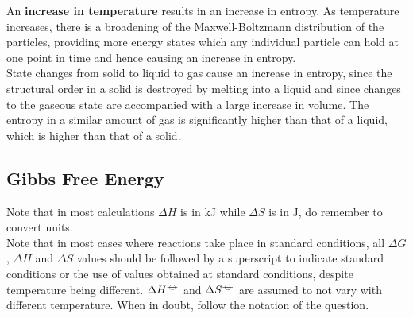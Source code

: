 \documentclass[../main]{subfiles}
\begin{document}

	An \textbf{increase in temperature} results in an increase in entropy. As temperature increases, there is a broadening of the Maxwell-Boltzmann distribution of the particles, providing more energy states which any individual particle can hold at one point in time and hence causing an increase in entropy. \\

	State changes from solid to liquid to gas cause an increase in entropy, since the structural order in a solid is destroyed by melting into a liquid and since changes to the gaseous state are accompanied with a large increase in volume. The entropy in a similar amount of gas is significantly higher than that of a liquid, which is higher than that of a solid.

	\subsection{Gibbs Free Energy}



	Note that in most calculations \(\Delta H\) is in \si{\kJ} while \(\Delta S\) is in \si{J}, do remember to convert units. \\

	Note that in most cases where reactions take place in standard conditions, all \(\Delta G\), \(\Delta H\) and \(\Delta S\) values should be followed by a superscript \plimsoll to indicate standard conditions or the use of values obtained at standard conditions, despite temperature being different. \(\Delta H^{-\kern-4pt{\ominus}\kern-4pt-}\) and \(\Delta S^{-\kern-4pt{\ominus}\kern-4pt-}\) are assumed to not vary with different temperature. When in doubt, follow the notation of the question.
\end{document}
